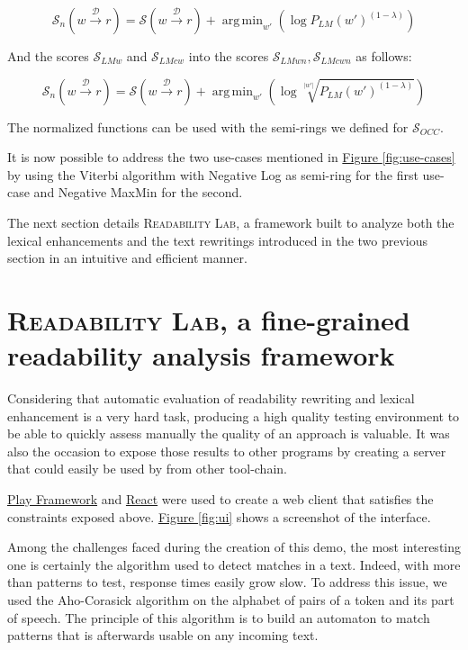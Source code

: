 \documentclass[a4paper, 11pt, onepage]{scrreprt}
\newcommand\figureref[1]{\hyperref[#1]{Figure \ref*{#1}}}
\newcommand\maps[1]{\xrightarrow{\mathcal{#1}}}
\newcommand\card[1]{\lvert #1 \rvert}
\newcommand\proba[2][]{P_{#1} \left( #2 \right)}
\DeclareMathOperator*{\argmin}{\arg\,\min}
\begin{document}
\[
\mathcal{S}_{n} \left( w \maps{D} r \right) = \mathcal{S} \left( w
  \maps{D} r \right) + \argmin_{w'} \left( \log \proba[LM]{w'}^{(1 - \lambda)} \right)
\]

And the scores $\mathcal{S}_{LMw}$ and $\mathcal{S}_{LMcw}$ into the
scores $\mathcal{S}_{LMwn}, \mathcal{S}_{LMcwn}$ as follows:

\[
\mathcal{S}_{n} \left( w \maps{D} r \right) = \mathcal{S} \left( w
  \maps{D} r \right) + \argmin_{w'} \left( \log
  \sqrt[\card{w'}]{\proba[LM]{w'}^{(1 - \lambda)}} \right)
\]

The normalized functions can be used with the semi-rings we defined
for $\mathcal{S}_{OCC}$.

It is now possible to address the two use-cases mentioned in
\figureref{fig:use-cases} by using the Viterbi algorithm
\cite{forney1973viterbi} with Negative Log as semi-ring for the first
use-case and Negative MaxMin for the second.

The next section details \textsc{Readability Lab}, a framework built
to analyze both the lexical enhancements and the text rewritings
introduced in the two previous section in an intuitive and efficient
manner.

\section{\textsc{Readability Lab}, a fine-grained readability analysis
  framework}
\label{sec:framework}

Considering that automatic evaluation of readability rewriting and
lexical enhancement is a very hard task, producing a high quality
testing environment to be able to quickly assess manually the quality
of an approach is valuable. It was also the occasion to expose those
results to other programs by creating a server that could easily be
used by from other tool-chain.

\href{http://www.playframework.com/}{Play Framework} and
\href{https://facebook.github.io/react/}{React} were used to create a
web client that satisfies the constraints exposed
above. \figureref{fig:ui} shows a screenshot of the interface.

Among the challenges faced during the creation of this demo, the most
interesting one is certainly the algorithm used to detect matches in a
text. Indeed, with more than  patterns to test,
response times easily grow slow. To address this issue, we used the
Aho-Corasick algorithm \cite{aho1975efficient} on the alphabet of
pairs of a token and its part of speech. The principle of this
algorithm is to build an automaton to match patterns that is
afterwards usable on any incoming text.
\end{document}
